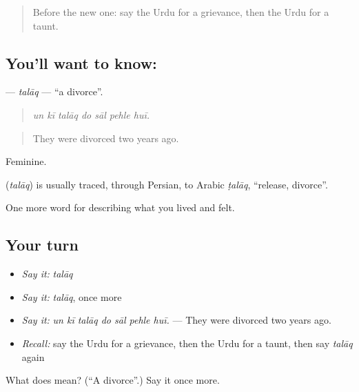 \begin{quote}
Before the new one: say the Urdu for a grievance, then the Urdu for a taunt.
\end{quote}

\subsection*{You'll want to know: }
\textbf{} — \emph{talāq} — \textquotedblleft{}a divorce\textquotedblright{}.

\begin{quote}
      
\end{quote}

\begin{quote}
\emph{un kī talāq do sāl pehle huī.}
\end{quote}

\begin{quote}
They were divorced two years ago.
\end{quote}

Feminine.

\begin{cousinweb}
\textbf{} (\emph{talāq}) is usually traced, through Persian, to Arabic \emph{ṭalāq}, \textquotedblleft{}release, divorce\textquotedblright{}.
\end{cousinweb}

\begin{grammarlens}[title={What you've built}]
One more word for describing what you lived and felt.
\end{grammarlens}

\subsection*{Your turn}
\begin{itemize}
\raggedright
  \item \emph{Say it:} \emph{talāq}
  \item \emph{Say it:} \emph{talāq}, once more
  \item \emph{Say it:} \emph{un kī talāq do sāl pehle huī.} — They were divorced two years ago.
  \item \emph{Recall:} say the Urdu for a grievance, then the Urdu for a taunt, then say \emph{talāq} again
\end{itemize}

\begin{tcolorbox}[breakable,colback=teal!4,colframe=teal!35!black,title={Before you move on}]
What does  mean? (\textquotedblleft{}A divorce\textquotedblright{}.) Say it once more.
\end{tcolorbox}
